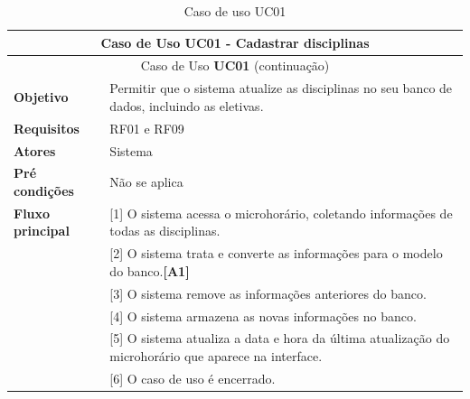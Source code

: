 \begin{longtable}{ | m{} | m{} | }
    \hline\hline
    \multicolumn{2}{|c|}{Caso de Uso \textbf{UC01} - Cadastrar disciplinas}\tabularnewline\hline\hline\endfirsthead
    \hline\hline
    \multicolumn{2}{|c|}{Caso de Uso \textbf{UC01} (continuação)}\tabularnewline\hline\hline\endhead
    \hline\endfoot
    \hline\caption{Caso de uso UC01}\endlastfoot

    \textbf{Objetivo} & Permitir que o sistema atualize as disciplinas no seu banco de dados, incluindo as eletivas.\tabularnewline\hline 
    \textbf{Requisitos} & RF01 e RF09\tabularnewline\hline
    \textbf{Atores} & Sistema\tabularnewline\hline
    \textbf{Pré condições} & Não se aplica\tabularnewline\hline

    \multirow{1}{*}{\textbf{Fluxo principal}} & [1] O sistema acessa o microhorário, coletando informações de todas as disciplinas.\tabularnewline\cline{2-2}
    & [2] O sistema trata e converte as informações para o modelo do banco.\textbf{[A1]}\tabularnewline\cline{2-2}
    & [3] O sistema remove as informações anteriores do banco.\tabularnewline\cline{2-2}
    & [4] O sistema armazena as novas informações no banco.\tabularnewline\cline{2-2}
    & [5] O sistema atualiza a data e hora da última atualização do microhorário que aparece na interface.\tabularnewline\cline{2-2}
    & [6] O caso de uso é encerrado.
    \label{tab:uc01}
\end{longtable}


